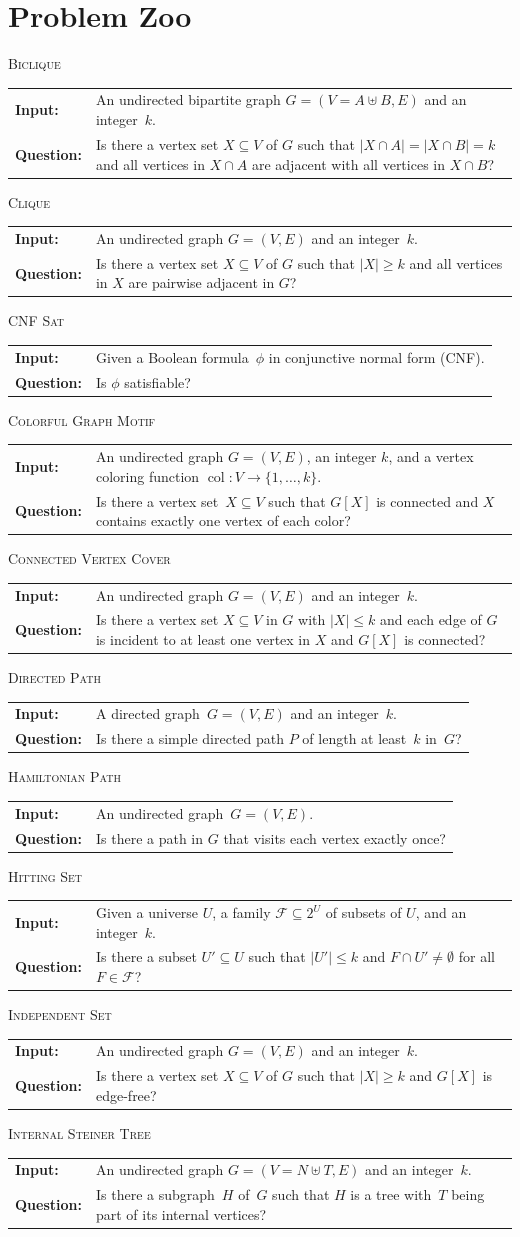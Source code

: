 \documentclass[11pt,a4,USenglish]{article}
\makeatletter
\newcommand{\prob}[1]{\textsc{#1}}
\DeclareMathOperator{\col}{col}
\theoremstyle{definition}
\theoremstyle{plain}
\theoremstyle{remark}
\newcommand{\decprob}[3]{
  \begin{center}
    \begin{minipage}{0.95\textwidth}
      \noindent
      \prob{#1}\vspace{2pt}\\
      \setlength{\tabcolsep}{3pt}
      \begin{tabularx}{\textwidth}{@{}lX@{}}
	\normalsize \textbf{Input:} 		& \normalsize #2 \\
	\normalsize \textbf{Question:} 	& \normalsize #3
      \end{tabularx}
    \end{minipage}
  \end{center}
}
\makeatother
\begin{document}
\newpage
\appendix

%

\section{Problem Zoo}
\label{sec:probzoo}
\decprob{Biclique}
{An undirected bipartite graph $G=(V=A\uplus B,E)$ and an integer~$k$.}
{Is there a vertex set $X\subseteq V$ of $G$ such that $|X\cap A|=|X\cap B|= k$ and all vertices in $X\cap A$ are adjacent with all vertices in $X\cap B$?}

\decprob{Clique}
{An undirected graph $G=(V,E)$ and an integer~$k$.}
{Is there a vertex set $X\subseteq V$ of $G$ such that $|X|\geq k$ and all vertices in $X$ are pairwise adjacent in $G$?}

\decprob{CNF Sat}
{Given a Boolean formula~$\phi$ in conjunctive normal form (CNF).}
{Is $\phi$ satisfiable?}

\decprob{Colorful Graph Motif}
{An undirected graph $G=(V,E)$, an integer $k$, and a vertex coloring function $\col:V \to \{1,\ldots,k\}$.}
{Is there a vertex set~$X\subseteq V$ such that $G[X]$ is connected and $X$ contains exactly one vertex of each color?}

\decprob{Connected Vertex Cover}
{An undirected graph $G=(V,E)$ and an integer~$k$.}
{Is there a vertex set $X\subseteq V$ in $G$ with $|X|\le k$ and each edge of $G$ is incident to at least one vertex in $X$ and $G[X]$ is connected?}

\decprob{Directed Path}
{A directed graph~$G=(V,E)$ and an integer~$k$.}
{Is there a simple directed path $P$ of length at least~$k$ in~$G$?}

%
%
%
%
%
%
%
%
%
%
%
%
%

\decprob{Hamiltonian Path}
{An undirected graph~$G=(V,E)$.}
{Is there a path in $G$ that visits each vertex exactly once?}

\decprob{Hitting Set}
{Given a universe $U$, a family $\mathcal{F}\subseteq 2^U$ of subsets of $U$, and an integer~$k$.}
{Is there a subset $U'\subseteq U$ such that $|U'|\leq k$ and $F\cap U'\neq \emptyset$ for all $F\in\mathcal{F}$?}

%
%
%
%
%

\decprob{Independent Set}
{An undirected graph $G=(V,E)$ and an integer~$k$.}
{Is there a vertex set $X\subseteq V$ of $G$ such that $|X|\geq k$ and $G[X]$ is edge-free?}


\decprob{Internal Steiner Tree}
{An undirected graph $G=(V=N\uplus T,E)$ and an integer~$k$.}
{Is there a subgraph~$H$ of~$G$ such that $H$ is a tree with~$T$ being part of its internal vertices?}
\end{document}
